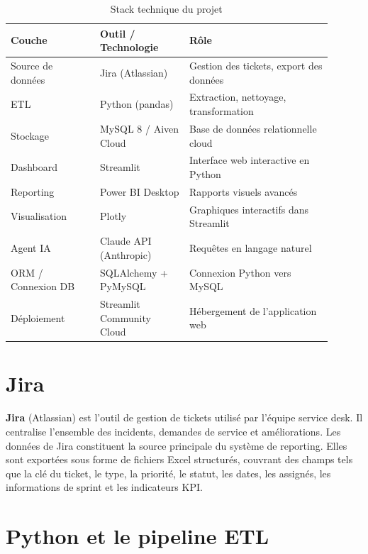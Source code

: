 \documentclass[12pt, a4paper]{report}
\begin{document}
\begin{table}[h!]
\centering
\begin{tabular}{p{0.25\linewidth} p{0.25\linewidth} p{0.4\linewidth}}
    \toprule
    \textbf{Couche} & \textbf{Outil / Technologie} & \textbf{Rôle} \\
    \midrule
    Source de données & Jira (Atlassian) & Gestion des tickets, export des données \\
    \midrule
    ETL & Python (pandas) & Extraction, nettoyage, transformation \\
    \midrule
    Stockage & MySQL 8 / Aiven Cloud & Base de données relationnelle cloud \\
    \midrule
    Dashboard & Streamlit & Interface web interactive en Python \\
    \midrule
    Reporting & Power BI Desktop & Rapports visuels avancés \\
    \midrule
    Visualisation & Plotly & Graphiques interactifs dans Streamlit \\
    \midrule
    Agent IA & Claude API (Anthropic) & Requêtes en langage naturel \\
    \midrule
    ORM / Connexion DB & SQLAlchemy + PyMySQL & Connexion Python vers MySQL \\
    \midrule
    Déploiement & Streamlit Community Cloud & Hébergement de l'application web \\
    \bottomrule
\end{tabular}
\caption{Stack technique du projet}
\end{table}

\section{Jira}

\textbf{Jira} (Atlassian) est l'outil de gestion de tickets utilisé par l'équipe service desk. Il centralise l'ensemble des incidents, demandes de service et améliorations. Les données de Jira constituent la source principale du système de reporting. Elles sont exportées sous forme de fichiers Excel structurés, couvrant des champs tels que la clé du ticket, le type, la priorité, le statut, les dates, les assignés, les informations de sprint et les indicateurs KPI.

\section{Python et le pipeline ETL}
\end{document}
